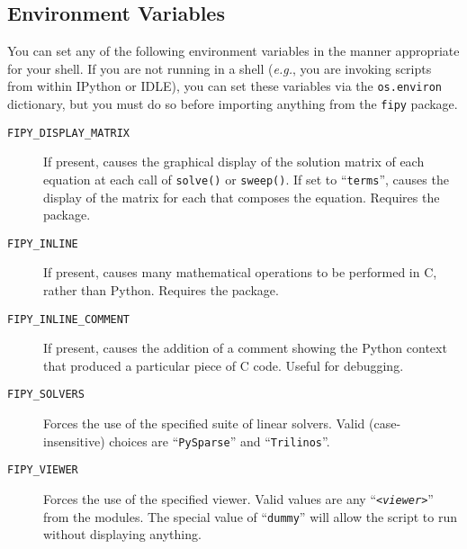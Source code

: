         \subsection{Environment Variables}
        You can set any of the following environment variables in the 
        manner appropriate for your shell. If you are not running in 
        a shell (\emph{e.g.}, you are invoking \FiPy{} scripts from within IPython or 
        IDLE), you can set these variables via the 
        \texttt{os.environ} dictionary, but you must do so before 
        importing anything from the \texttt{fipy} package.
        \begin{description}
            \item[\texttt{FIPY\_DISPLAY\_MATRIX}] If present, causes
            the graphical display of the solution matrix of each
            equation at each call of \texttt{solve()} or
            \texttt{sweep()}. If set to ``\texttt{terms}'', causes the
            display of the matrix for each  that composes
            the equation. Requires the \Matplotlib{} package.

            \item[\texttt{FIPY\_INLINE}] If present, causes many
            mathematical operations to be performed in C, rather than
            Python. Requires the \SciPy{} \weave{} package.
        
            \item[\texttt{FIPY\_INLINE\_COMMENT}] If present, causes
            the addition of a comment showing the Python context that
            produced a particular piece of \SciPy{} \weave{} C code.
            Useful for debugging.
        
            \item[\texttt{FIPY\_SOLVERS}] Forces the use of the
            specified suite of linear solvers. Valid
            (case-insensitive) choices are ``\texttt{PySparse}'' and
            ``\texttt{Trilinos}''.
            
            \item[\texttt{FIPY\_VIEWER}] Forces the use of the 
            specified viewer. Valid values are any 
            ``\texttt{\textit{<viewer>}}''
            from the \texttt{} 
            modules. The special value of ``\texttt{dummy}'' will 
            allow the script to run without displaying anything.
        \end{description}

